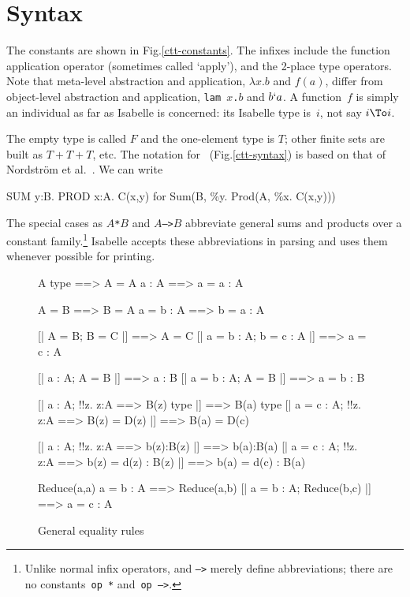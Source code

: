 

\section{Syntax}
The constants are shown in Fig.\ts\ref{ctt-constants}.  The infixes include
the function application operator (sometimes called `apply'), and the
2-place type operators.  Note that meta-level abstraction and application,
$\lambda x.b$ and $f(a)$, differ from object-level abstraction and
application, \hbox{\tt lam $x$.$b$} and $b{\tt`}a$.  A {\CTT}
function~$f$ is simply an individual as far as Isabelle is concerned: its
Isabelle type is~$i$, not say $i\To i$.

The empty type is called $F$ and the one-element type is $T$; other finite
sets are built as $T+T+T$, etc.  The notation for~{\CTT}
(Fig.\ts\ref{ctt-syntax}) is based on that of Nordstr\"om et
al.~\cite{nordstrom90}.  We can write
\begin{ttbox}
SUM y:B. PROD x:A. C(x,y)   {\rm for}   Sum(B, \%y. Prod(A, \%x. C(x,y)))
\end{ttbox}
The special cases as \hbox{\tt$A$*$B$} and \hbox{\tt$A$-->$B$} abbreviate
general sums and products over a constant family.\footnote{Unlike normal
infix operators, {\tt*} and {\tt-->} merely define abbreviations; there are
no constants~{\tt op~*} and~\hbox{\tt op~-->}.}  Isabelle accepts these
abbreviations in parsing and uses them whenever possible for printing.


\begin{figure} 
\begin{ttbox}
         A type ==> A = A
         a : A ==> a = a : A

          A = B ==> B = A
          a = b : A ==> b = a : A

        [| A = B;  B = C |] ==> A = C
        [| a = b : A;  b = c : A |] ==> a = c : A

       [| a : A;  A = B |] ==> a : B
      [| a = b : A;  A = B |] ==> a = b : B

        [| a : A;  !!z. z:A ==> B(z) type |] ==> B(a) type
       [| a = c : A;  !!z. z:A ==> B(z) = D(z) 
                  |] ==> B(a) = D(c)

        [| a : A;  !!z. z:A ==> b(z):B(z) |] ==> b(a):B(a)
       [| a = c : A;  !!z. z:A ==> b(z) = d(z) : B(z) 
                  |] ==> b(a) = d(c) : B(a)

          Reduce(a,a)
      a = b : A ==> Reduce(a,b)
         [| a = b : A;  Reduce(b,c) |] ==> a = c : A
\end{ttbox}
\caption{General equality rules} \label{ctt-equality}
\end{figure}


